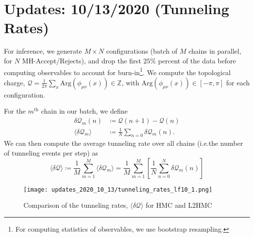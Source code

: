 %
\section{Updates: 10/13/2020 (Tunneling Rates)}%
\label{sec:updates_2020_10_13}
%
For inference, we generate \(M\times N\) configurations (batch of \(M\) chains in
parallel, for \(N\) MH-Accept/Rejects), and drop the first \(25\%\)
percent of the data before computing observables to account for
burn-in\footnote{For computing statistics of observables, we use bootstrap
resampling.}.
%
We compute the topological charge, \(\mathcal{Q} =
\frac{1}{2\pi}\sum_{x}\mathrm{Arg}\left(\phi_{\mu\nu}(x)\right) \in
\mathbb{Z}\), with \( \mathrm{Arg}\left(\phi_{\mu\nu}(x)\right) \in \left[-\pi,
\pi\right]\) for each configuration.
%

For the \(m^{\mathrm{th}}\) chain in our batch, we define 
%
\begin{align}
  \delta\mathcal{Q}_{m}(n) &\coloneqq \mathcal{Q}{(n+1)} - \mathcal{Q}{(n)}\\
  \langle\delta\mathcal{Q}_{m}\rangle &\coloneqq
  \frac{1}{N}\sum_{n=0}\delta\mathcal{Q}_{m}(n).
\end{align}
%
We can then compute the average tunneling rate over all chains (i.e.\@ the
number of tunneling events per step) as
%
\begin{equation}
  \langle \delta\mathcal{Q}\rangle%
  \coloneqq \frac{1}{M}\sum_{m=1}^{M}\langle\delta\mathcal{Q}_{m}\rangle
  =\frac{1}{M}\sum_{m=1}^{M}\left[\frac{1}{N}\sum_{n=0}^{N} \delta\mathcal{Q}_{m}(n)\right]
\end{equation}
%

\begin{figure}[htpb]
  \centering
  \texttt{[image: updates\_2020\_10\_13/tunneling\_rates\_lf10\_1.png]}
  \caption{Comparison of the tunneling rates,
  \(\langle\delta\mathcal{Q}\rangle\) for HMC and L2HMC}
\end{figure}

% 
%
